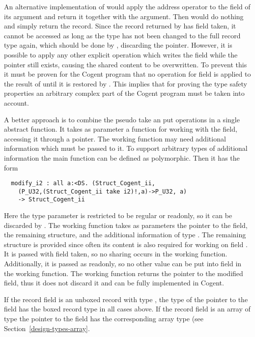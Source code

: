 An alternative implementation of  would apply the address operator to the field  of 
its argument and return it together with the argument. Then  would do nothing and simply 
return the record. Since the record returned by  has field  taken, it
cannot be accessed as long as the type has not been changed to the full record type again, which should be 
done by , discarding the pointer. However, it is possible to apply any other explicit 
operation which writes the field  while the pointer still exists, causing the shared content to
be overwritten. To prevent this it must be proven for the Cogent program that no  operation for field 
 is applied to the result of  until it is restored by . This implies that
for proving the type safety properties an arbitrary complex part of the Cogent program must be taken into
account.

A better approach is to combine the pseudo take an put operations in a single abstract function. It takes
as parameter a function for working with the field, accessing it through a pointer. The working function
may need additional information which must be passed to it. To support arbitrary types of additional information
the main function can be defined as polymorphic. Then it has the form
\begin{verbatim}
  modify_i2 : all a:<DS. (Struct_Cogent_ii,
    (P_U32,(Struct_Cogent_ii take i2)!,a)->P_U32, a)
    -> Struct_Cogent_ii
\end{verbatim}
Here the type parameter  is restricted to be regular or readonly, so it can be discarded by .
The working function takes as parameters the pointer to the field, the remaining structure, and the additional information
of type . The remaining structure is provided since often its content is also required for working on 
field . It is passed with field  taken, so no sharing occurs in the working function. Additionally,
it is passed as readonly, so no other value can be put into field  in the working function. The working
function returns the pointer to the modified field, thus it does not discard it and can be fully implemented in Cogent.

If the record field is an unboxed record with type , the type of the pointer to the field has the boxed record
type  in all cases above. If the record field is an array of type  the pointer to the field
has the corresponding array type  (see Section~\ref{design-types-array}.

